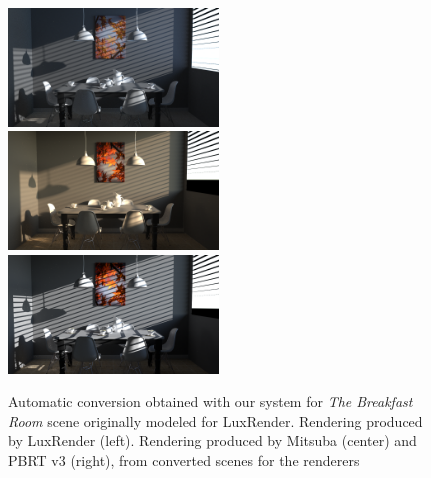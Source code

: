 \begin{figure}
\centering
\includegraphics[width=2.2in]{figs/4_results/dining_room/1_from_lux.png}
\includegraphics[width=2.2in]{figs/4_results/dining_room/2_to_mitsuba.png}
\includegraphics[width=2.2in]{figs/4_results/dining_room/3_to_pbrt.png}
\caption{Automatic conversion obtained with our system for \textit{The Breakfast Room}
scene originally modeled for LuxRender. Rendering produced by LuxRender (left).
Rendering produced by Mitsuba (center) and PBRT v3 (right),
from converted scenes for the renderers}
\label{fig:dining-room}
\end{figure}

